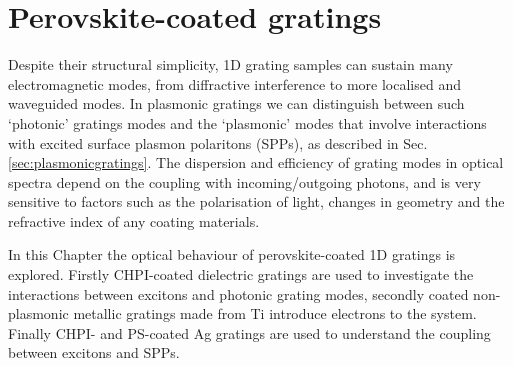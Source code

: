 
\chapter{Perovskite-coated gratings}

\graphicspath{{Chapter7/Figures/}}

Despite their structural simplicity, 1D grating samples can sustain many electromagnetic modes, from diffractive interference to more localised and waveguided modes. In plasmonic gratings we can distinguish between such `photonic' gratings modes and the `plasmonic' modes that involve interactions with excited surface plasmon polaritons (SPPs), as described in Sec.\,\ref{sec:plasmonicgratings}. The dispersion and efficiency of grating modes in optical spectra depend on the coupling with incoming/outgoing photons, and is very sensitive to factors such as the polarisation of light, changes in geometry and the refractive index of any coating materials.

In this Chapter the optical behaviour of perovskite-coated 1D gratings is explored. Firstly CHPI-coated dielectric gratings are used to investigate the interactions between excitons and photonic grating modes, secondly coated non-plasmonic metallic gratings made from Ti introduce electrons to the system. Finally CHPI- and PS-coated Ag gratings are used to understand the coupling between excitons and SPPs. 


